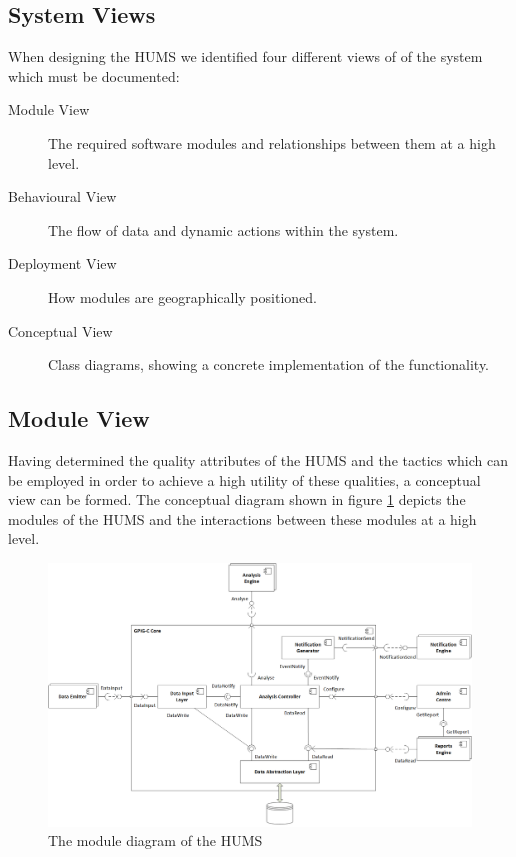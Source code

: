 \documentclass[10pt,a4paper]{article}
\begin{document}
\subsection{System Views}
\label{sec:architecture-views}

When designing the HUMS we identified four different views of of the
system which must be documented:

\begin{description}
  \item[Module View] The required software modules and relationships
    between them at a high level.

  \item[Behavioural View] The flow of data and dynamic actions within
    the system.

  \item[Deployment View] How modules are geographically positioned.

  \item[Conceptual View] Class diagrams, showing a concrete
    implementation of the functionality.
\end{description}

\subsection{Module View}
\label{sec:architecture-moduleview}

Having determined the quality attributes of the HUMS and the tactics
which can be employed in order to achieve a high utility of these
qualities, a conceptual view can be formed. The conceptual diagram
shown in figure \ref{fig:ComponentDiagram} depicts the modules of the
HUMS and the interactions between these modules at a high level.


\begin{figure}[!ht]
  \centering
  \includegraphics[width=14cm]{images/ComponentDiagram.png}
  \caption{The module diagram of the HUMS}
  \label{fig:ComponentDiagram}
\end{figure}
\end{document}
